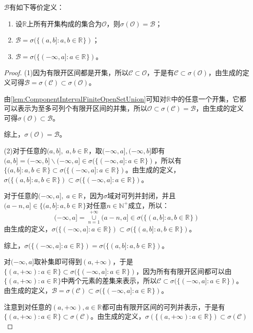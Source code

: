 \begin{theorem}
	$\mathcal{B}$有如下等价定义：
	\begin{enumerate}
		\item 设$\mathbb{R}$上所有开集构成的集合为$\mathcal{O}$，则$\sigma(\mathcal{O})=\mathcal{B}$；
		\item $\mathcal{B}=\sigma(\{(a,b]:a,b\in\mathbb{R}^{}\})$；
		\item $\mathcal{B}=\sigma(\{(-\infty,a]:a\in\mathbb{R}^{}\})$。
	\end{enumerate}
\end{theorem}
\begin{proof}
	(1)因为有限开区间都是开集，所以$\mathcal{C}\subset\mathcal{O}$，于是有$\mathcal{C}\subset\sigma(\mathcal{O})$，由生成的定义可得$\mathcal{B}=\sigma(\mathcal{C})\subset\sigma(\mathcal{O})$。\par
	由\cref{lem:ComponentIntervalFiniteOpenSetUnion}可知对$\mathbb{R}^{}$中的任意一个开集，它都可以表示为至多可列个有限开区间的并集，所以$\mathcal{O}\subset\sigma(\mathcal{C})=\mathcal{B}$，由生成的定义可得$\sigma(\mathcal{O})\subset\mathcal{B}$。\par
	综上，$\sigma(\mathcal{O})=\mathcal{B}$。\par
	(2)对于任意的$(a,b],\;a,b\in\mathbb{R}^{}$，取$(-\infty,a],(-\infty,b]$即有$(a,b]=(-\infty,b]\backslash(-\infty,a]\in\sigma(\{(-\infty,a]:a\in\mathbb{R}^{}\})$，所以有$\{(a,b]:a,b\in\mathbb{R}^{}\}\subset\sigma(\{(-\infty,a]:a\in\mathbb{R}^{}\})$。由生成的定义，$\sigma(\{(a,b]:a,b\in\mathbb{R}^{}\})\subset\sigma(\{(-\infty,a]:a\in\mathbb{R}^{}\})$。\par
	对于任意的$(-\infty,a],\;a\in\mathbb{R}^{}$，因为$\sigma$域对可列并封闭，并且$(a-n,a]\in\{(a,b]:a,b\in\mathbb{R}^{}\}$对任意$n\in\mathbb{N}^+$成立，所以：
	\begin{equation*}
		(-\infty,a]=\underset{n=1}{\overset{+\infty}{\cup}}(a-n,a]\in\sigma(\{(a,b]:a,b\in\mathbb{R}^{}\})
	\end{equation*}
	由生成的定义，$\sigma(\{(-\infty,a]:a\in\mathbb{R}^{}\})\subset\sigma(\{(a,b]:a,b\in\mathbb{R}^{}\})$。\par
	综上，$\sigma(\{(-\infty,a]:a\in\mathbb{R}^{}\})=\sigma(\{(a,b]:a,b\in\mathbb{R}^{}\})$。\par
	对$(-\infty,a]$取补集即可得到$(a,+\infty)$，于是$\{(a,+\infty):a\in\mathbb{R}^{}\}\subset\sigma(\{(-\infty,a]:a\in\mathbb{R}^{}\})$，因为所有有限开区间都可以由$\{(a,+\infty):a\in\mathbb{R}^{}\}$中两个元素的差集来表示，所以$\mathcal{C}\subset\sigma(\{(-\infty,a]:a\in\mathbb{R}^{}\})$。由生成的定义，$\mathcal{B}=\sigma(\mathcal{C})\subset\sigma(\{(-\infty,a]:a\in\mathbb{R}^{}\})$。\par
	注意到对任意的$(a,+\infty),a\in\mathbb{R}^{}$都可由有限开区间的可列并表示，于是有$\{(a,+\infty):a\in\mathbb{R}^{}\}\subset\sigma(\mathcal{C})$。由生成的定义，$\sigma(\{(a,+\infty):a\in\mathbb{R}^{}\})\subset\sigma(\mathcal{C})$
\end{proof}

